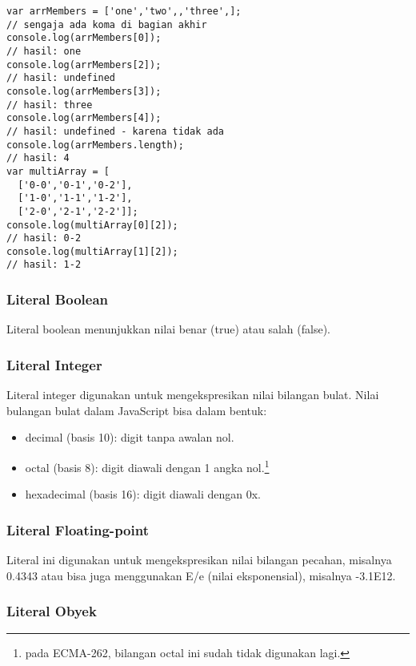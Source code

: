 \lstset{language=JavaScript,caption=Array di JavaScript}
\begin{lstlisting}
var arrMembers = ['one','two',,'three',];
// sengaja ada koma di bagian akhir
console.log(arrMembers[0]);
// hasil: one
console.log(arrMembers[2]);
// hasil: undefined
console.log(arrMembers[3]);
// hasil: three
console.log(arrMembers[4]);
// hasil: undefined - karena tidak ada
console.log(arrMembers.length);
// hasil: 4
var multiArray = [
  ['0-0','0-1','0-2'],
  ['1-0','1-1','1-2'],
  ['2-0','2-1','2-2']];
console.log(multiArray[0][2]);
// hasil: 0-2
console.log(multiArray[1][2]);
// hasil: 1-2
\end{lstlisting}

\subsubsection{Literal Boolean}

Literal boolean menunjukkan nilai benar (true) atau salah (false).

\subsubsection{Literal Integer}

Literal integer digunakan untuk mengekspresikan nilai bilangan bulat. Nilai bulangan bulat dalam JavaScript bisa dalam bentuk:
\begin{itemize}
  \item decimal (basis 10): digit tanpa awalan nol.
  \item octal (basis 8): digit diawali dengan 1 angka nol.\footnote{pada ECMA-262, bilangan octal ini sudah tidak digunakan lagi.}
  \item hexadecimal (basis 16): digit diawali dengan 0x.
\end{itemize}

\subsubsection{Literal Floating-point}

Literal ini digunakan untuk mengekspresikan nilai bilangan pecahan, misalnya 0.4343 atau bisa juga menggunakan E/e (nilai eksponensial), misalnya 
-3.1E12.

\subsubsection{Literal Obyek}

